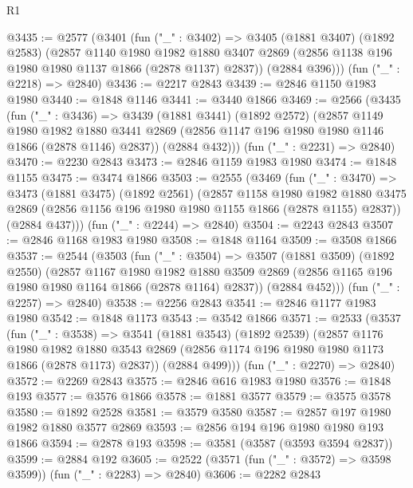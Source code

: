 \begin{lexlean}{R1}
\begin{coremodule}
@3435 := @2577
    (@3401
      (fun ("_" : @3402) =>
      @3405
        (@1881 @3407)
        (@1892 @2583)
        (@2857
          @1140
          @1980
          @1982
          @1880
          @3407
          @2869
          (@2856 @1138 @196 @1980 @1980 @1137 @1866 (@2878 @1137) @2837))
        (@2884 @396)))
    (fun ("_" : @2218) => @2840)
@3436 := @2217 @2843
@3439 := @2846 @1150 @1983 @1980
@3440 := @1848 @1146
@3441 := @3440 @1866
@3469 := @2566
    (@3435
      (fun ("_" : @3436) =>
      @3439
        (@1881 @3441)
        (@1892 @2572)
        (@2857
          @1149
          @1980
          @1982
          @1880
          @3441
          @2869
          (@2856 @1147 @196 @1980 @1980 @1146 @1866 (@2878 @1146) @2837))
        (@2884 @432)))
    (fun ("_" : @2231) => @2840)
@3470 := @2230 @2843
@3473 := @2846 @1159 @1983 @1980
@3474 := @1848 @1155
@3475 := @3474 @1866
@3503 := @2555
    (@3469
      (fun ("_" : @3470) =>
      @3473
        (@1881 @3475)
        (@1892 @2561)
        (@2857
          @1158
          @1980
          @1982
          @1880
          @3475
          @2869
          (@2856 @1156 @196 @1980 @1980 @1155 @1866 (@2878 @1155) @2837))
        (@2884 @437)))
    (fun ("_" : @2244) => @2840)
@3504 := @2243 @2843
@3507 := @2846 @1168 @1983 @1980
@3508 := @1848 @1164
@3509 := @3508 @1866
@3537 := @2544
    (@3503
      (fun ("_" : @3504) =>
      @3507
        (@1881 @3509)
        (@1892 @2550)
        (@2857
          @1167
          @1980
          @1982
          @1880
          @3509
          @2869
          (@2856 @1165 @196 @1980 @1980 @1164 @1866 (@2878 @1164) @2837))
        (@2884 @452)))
    (fun ("_" : @2257) => @2840)
@3538 := @2256 @2843
@3541 := @2846 @1177 @1983 @1980
@3542 := @1848 @1173
@3543 := @3542 @1866
@3571 := @2533
    (@3537
      (fun ("_" : @3538) =>
      @3541
        (@1881 @3543)
        (@1892 @2539)
        (@2857
          @1176
          @1980
          @1982
          @1880
          @3543
          @2869
          (@2856 @1174 @196 @1980 @1980 @1173 @1866 (@2878 @1173) @2837))
        (@2884 @499)))
    (fun ("_" : @2270) => @2840)
@3572 := @2269 @2843
@3575 := @2846 @616 @1983 @1980
@3576 := @1848 @193
@3577 := @3576 @1866
@3578 := @1881 @3577
@3579 := @3575 @3578
@3580 := @1892 @2528
@3581 := @3579 @3580
@3587 := @2857 @197 @1980 @1982 @1880 @3577 @2869
@3593 := @2856 @194 @196 @1980 @1980 @193 @1866
@3594 := @2878 @193
@3598 := @3581 (@3587 (@3593 @3594 @2837))
@3599 := @2884 @192
@3605 := @2522 (@3571 (fun ("_" : @3572) => @3598 @3599)) (fun ("_" : @2283) => @2840)
@3606 := @2282 @2843

\end{coremodule}
\end{lexlean}
